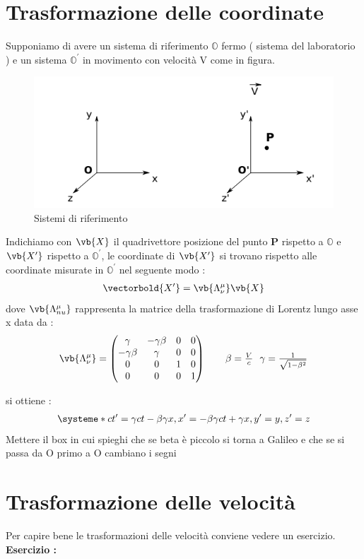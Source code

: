 \documentclass[a4paper, 12pt, twoside]{report}
\begin{document}
\section{Trasformazione delle coordinate}
Supponiamo di avere un sistema di riferimento $\mathbb O$ fermo ( sistema del laboratorio ) e un sistema $\mathbb O^{'} $ in movimento 
con velocità V come in figura.\\

\begin{figure}[!h]
        \centering 
        \includegraphics[scale=0.8]{SistemaRiferimento}
        \caption{Sistemi di riferimento}
\end{figure}
Indichiamo con $\vb{X}$ il quadrivettore posizione del punto \textbf{P} rispetto a $\mathbb O$ e $\vb{X^\prime}$ rispetto a $\mathbb O^\prime$, le coordinate di 
$\vb{X^\prime}$ si trovano rispetto alle coordinate misurate in $\mathbb O^\prime$ nel seguente modo : 
\begin{align*}
        \vectorbold{X^\prime} = \vb{\Lambda^{\mu}_{\nu}} \vb{X} 
\end{align*} 
dove $\vb{\Lambda^{\mu}_{nu}}$ rappresenta la matrice della trasformazione di Lorentz lungo asse x data da : 
\begin{align*}
        \vb{\Lambda^{\mu}_{\nu}} = \begin{pmatrix} \gamma & -\gamma\beta & 0 & 0 \\ -\gamma\beta & \gamma & 0 & 0 \\ 0 & 0 & 1 & 0 \\ 0 & 0 & 0 & 1 \end{pmatrix} \tag*{$\beta = \frac{V}{c} \ \ \gamma = \frac{1}{\sqrt{1-\beta^2}}$}\\
\end{align*}

si ottiene :
\begin{align*}
    \systeme*{
    ct^\prime = \gamma ct - \beta\gamma x,
    x^\prime = -\beta\gamma ct + \gamma x,
    y^\prime =y,
    z^\prime =z
}
\end{align*}
Mettere il box in cui spieghi che se beta è piccolo si torna a Galileo e che se si passa da O primo a O cambiano i segni
\newpage
\section{Trasformazione delle velocità}
Per capire bene le trasformazioni delle velocità conviene vedere un esercizio.\\
\textbf{Esercizio : }
\end{document}
